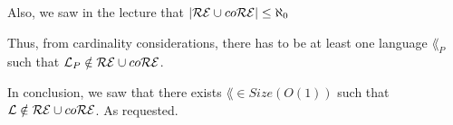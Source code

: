 Also, we saw in the lecture that $|\mathcal{R}\mathcal{E} \cup co\mathcal{R}\mathcal{E}| \leq \aleph_0$

Thus, from cardinality considerations, there has to be at least one language $\lang_P$ such that $\mathcal{L}_P \notin \mathcal{R}\mathcal{E} \cup co\mathcal{R}\mathcal{E}$.

In conclusion, we saw that there exists $\lang \in Size(O(1))$ such that $\mathcal{L} \notin \mathcal{R}\mathcal{E} \cup co\mathcal{R}\mathcal{E}$. As requested. \\